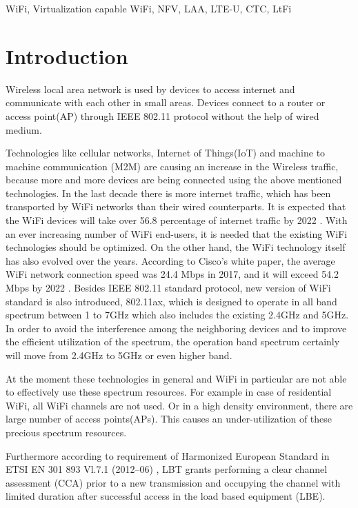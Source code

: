 \documentclass{IEEEtran}
\begin{document}
\begin{IEEEkeywords}
WiFi, Virtualization capable WiFi, NFV, LAA, LTE-U, CTC, LtFi
\end{IEEEkeywords}

\section{Introduction}


Wireless local area network is used by devices to access internet and communicate with each other in small areas. Devices connect to a router or access point(AP) through IEEE 802.11 protocol without the help of wired medium. 

Technologies like cellular networks, Internet of Things(IoT) and machine to machine communication (M2M) are causing an increase in the Wireless traffic, because more and more devices are being connected using the above mentioned technologies. In the last decade there is  more internet traffic, which has been transported by WiFi networks than their wired counterparts. It is expected that the WiFi devices will take over 56.8 percentage of internet traffic by 2022 \cite{cisco2018cisco}. With an ever increasing number of WiFi end-users, it is needed that the existing WiFi technologies should be optimized. On the other hand, the WiFi technology itself has also evolved over the years. According to Cisco's white paper, the average WiFi network connection speed was 24.4 Mbps in 2017, and it will exceed 54.2 Mbps by 2022 \cite{cisco2018cisco}. Besides IEEE 802.11 standard protocol, new version of WiFi standard is also introduced, 802.11ax, which is designed to operate in all band spectrum between 1 to 7GHz which also includes the existing 2.4GHz and 5GHz. In order to avoid the interference among the neighboring devices and to improve the efficient utilization of the spectrum, the operation band spectrum certainly will move from 2.4GHz to 5GHz or even higher band.

At the moment these technologies in general and WiFi in particular are not able to effectively use these spectrum resources. For example in case of residential WiFi, all WiFi channels are not used. Or in a high density environment, there are large number of access points(APs). This causes an under-utilization of these precious spectrum resources.

Furthermore according to requirement of Harmonized European Standard in ETSI EN 301 893 Vl.7.1 (2012–06) , LBT grants performing a clear channel assessment (CCA) prior to a new transmission and occupying the channel with limited duration after successful access in the load based equipment (LBE).
\end{document}
